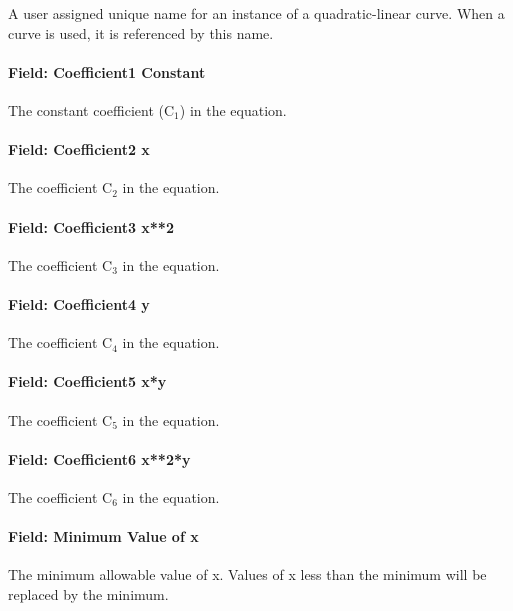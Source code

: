 A user assigned unique name for an instance of a quadratic-linear curve. When a curve is used, it is referenced by this name.

\paragraph{Field: Coefficient1 Constant}\label{field-coefficient1-constant-9}

The constant coefficient (C\(_{1}\)) in the equation.

\paragraph{Field: Coefficient2 x}\label{field-coefficient2-x-7}

The coefficient C\(_{2}\) in the equation.

\paragraph{Field: Coefficient3 x**2}\label{field-coefficient3-x2-5}

The coefficient C\(_{3}\) in the equation.

\paragraph{Field: Coefficient4 y}\label{field-coefficient4-y-3}

The coefficient C\(_{4}\) in the equation.

\paragraph{Field: Coefficient5 x*y}\label{field-coefficient5-xy}

The coefficient C\(_{5}\) in the equation.

\paragraph{Field: Coefficient6 x**2*y}\label{field-coefficient6-x2y}

The coefficient C\(_{6}\) in the equation.

\paragraph{Field: Minimum Value of x}\label{field-minimum-value-of-x-10}

The minimum allowable value of x. Values of x less than the minimum will be replaced by the minimum.

